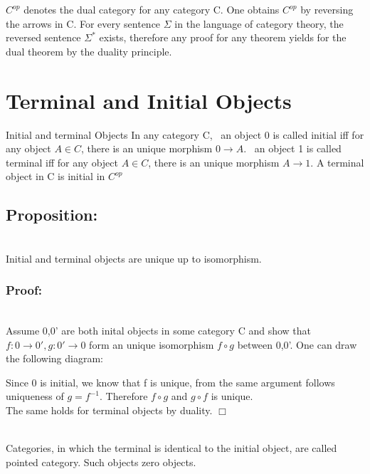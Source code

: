  $C^{op}$ denotes the dual category for any category C. One obtains $C^{op}$ by reversing the arrows in C. For every sentence $\Sigma$ in the language of category theory, the reversed sentence $\Sigma^*$ exists, therefore any proof for any theorem yields for the dual theorem by the duality principle.  

\section {Terminal and Initial Objects}
\begin {definition}{Initial and terminal Objects}
  In any category C,
  \ an object 0 is called initial iff for any object $A \in C$, there is an unique morphism $0 \to A$.
  \ an object 1 is called terminal iff for any object $A \in C$, there is an unique morphism $A \to 1$. A terminal object in C is initial in $C^{op}$

\end {definition}

\subsection {Proposition:}
  \\ Initial and terminal objects are unique up to isomorphism.

\subsubsection {Proof:}
  \\ Assume 0,0' are both inital objects in some category C and show that $f: 0 \to 0', g: 0' \to 0$ form an unique isomorphism $f \circ g$ between 0,0'. One can draw the following diagram:
  
 

  Since 0 is initial, we know that f is unique, from the same argument follows uniqueness of $g = f^{-1}$. Therefore $f \circ g$ and $g \circ f$ is unique.    
    \\ The same holds for terminal objects by duality. $\Box$

    \\    Categories, in which the terminal is identical to the initial object, are called pointed category. Such objects zero objects.

